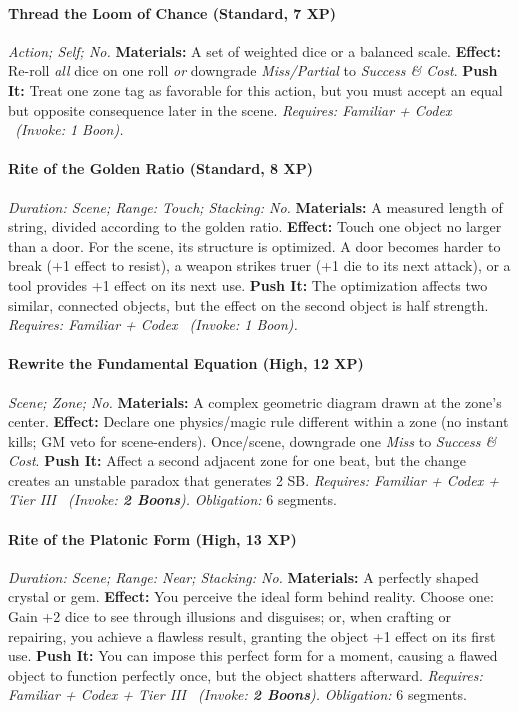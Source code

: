 \paragraph{Thread the Loom of Chance (Standard, 7 XP)} \emph{Action; Self; No.}
\textbf{Materials:} A set of weighted dice or a balanced scale.
\textbf{Effect:} Re-roll \emph{all} dice on one roll \emph{or} downgrade \emph{Miss/Partial} to \emph{Success \& Cost}.
\textbf{Push It:} Treat one zone tag as favorable for this action, but you must accept an equal but opposite consequence later in the scene.
\emph{Requires: Familiar + Codex \ (\textit{Invoke:} 1 Boon).}
\paragraph{Rite of the Golden Ratio (Standard, 8 XP)} \emph{Duration: Scene; Range: Touch; Stacking: No.}
\textbf{Materials:} A measured length of string, divided according to the golden ratio.
\textbf{Effect:} Touch one object no larger than a door. For the scene, its structure is optimized. A door becomes harder to break (+1 effect to resist), a weapon strikes truer (+1 die to its next attack), or a tool provides +1 effect on its next use.
\textbf{Push It:} The optimization affects two similar, connected objects, but the effect on the second object is half strength.
\emph{Requires: Familiar + Codex \ (\textit{Invoke:} 1 Boon).}
\paragraph{Rewrite the Fundamental Equation (High, 12 XP)} \emph{Scene; Zone; No.}
\textbf{Materials:} A complex geometric diagram drawn at the zone's center.
\textbf{Effect:} Declare one physics/magic rule different within a zone (no instant kills; GM veto for scene-enders). Once/scene, downgrade one \emph{Miss} to \emph{Success \& Cost}.
\textbf{Push It:} Affect a second adjacent zone for one beat, but the change creates an unstable paradox that generates 2 SB.
\emph{Requires: Familiar + Codex + Tier III \ (\textit{Invoke:} \textbf{2 Boons}).}
\emph{Obligation:} 6 segments.

\paragraph{Rite of the Platonic Form (High, 13 XP)} \emph{Duration: Scene; Range: Near; Stacking: No.}
\textbf{Materials:} A perfectly shaped crystal or gem.
\textbf{Effect:} You perceive the ideal form behind reality. Choose one: Gain +2 dice to see through illusions and disguises; or, when crafting or repairing, you achieve a flawless result, granting the object +1 effect on its first use.
\textbf{Push It:} You can impose this perfect form for a moment, causing a flawed object to function perfectly once, but the object shatters afterward.
\emph{Requires: Familiar + Codex + Tier III \ (\textit{Invoke:} \textbf{2 Boons}).}
\emph{Obligation:} 6 segments.

